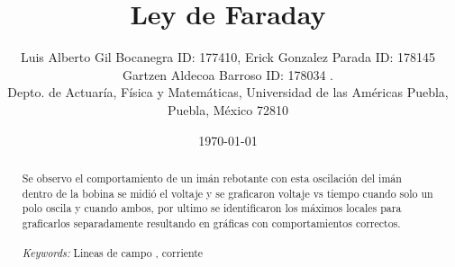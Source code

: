 \documentclass{article}
\begin{document}

\renewcommand{\footrulewidth}{1pt}
\renewcommand{\tablename}{Tabla}
\renewcommand{\figurename}{Figura}


\title{Ley de Faraday}
\author{\small{Luis Alberto Gil Bocanegra ID: 177410, Erick Gonzalez Parada ID: 178145}\\
 \small{Gartzen Aldecoa Barroso ID: 178034 .}\\		%
	   \small{Depto. de Actuaría, Física y Matemáticas, Universidad de las Américas Puebla, Puebla, M\'exico 72810}}
\date{\small{\today}}

\maketitle


\begin{abstract}
Se observo el comportamiento de un imán rebotante
con esta oscilación del imán dentro de la bobina se midió el voltaje 
y se graficaron voltaje vs tiempo cuando solo un polo oscila y cuando ambos,
por ultimo se identificaron los máximos locales para graficarlos separadamente
resultando en gráficas con comportamientos correctos.
\\
\\
{\it Keywords:} Lineas de campo , corriente  
\\
\\
\end{abstract}
\end{document}
